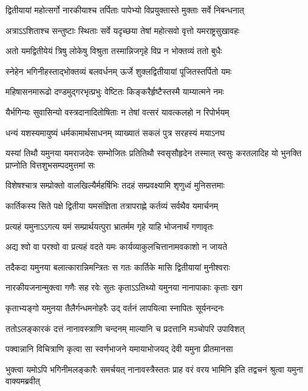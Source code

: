 \twolineshloka
{द्वितीयायां महोत्सर्गो नारकीयाश्च तर्पिताः}
{पापेभ्यो विप्रयुक्तास्ते मुक्ताः सर्वे निबन्धनात्} %

\twolineshloka
{अत्राऽऽशिताश्च सन्तुष्टाः स्थिताः सर्वे यदृच्छया}
{तेषां महोत्सवो वृत्तो यमराष्ट्रसुखावहः} %

\twolineshloka
{अतो यमद्वितीयेयं त्रिषु लोकेषु विश्रुता}
{तस्मान्निजगृहे विप्र न भोक्तव्यं ततो बुधैः} %

\twolineshloka
{स्नेहेन भगिनीहस्ताद्भोक्तव्यं बलवर्धनम्}
{ऊर्जे शुक्लद्वितीयायां पूजितस्तर्पितो यमः} %

\twolineshloka
{महिषासनमारूढो दण्डमुद्गरभृत्प्रभुः}
{वेष्टितः किङ्करैर्हृष्टैस्तस्मै याम्यात्मने नमः} %

\twolineshloka
{यैर्भगिन्यः सुवासिन्यो वस्त्रदानादितोषिताः}
{न तेषां वत्सरं यावत्कलहो न रिपोर्भयम्} %

\twolineshloka
{धन्यं यशस्यमायुष्यं धर्मकामार्थसाधनम्}
{व्याख्यातं सकलं पुत्र सरहस्यं मयाऽनघ} %

\fourlineindentedshloka
{यस्यां तिथौ यमुनया यमराजदेवः}
{सम्भोजितः प्रतितिथौ स्वसृसौहृदेन}
{तस्मात् स्वसुः करतलादिह यो भुनक्ति}
{प्राप्नोति वित्तशुभसम्पदमुत्तमां सः} %

\twolineshloka
{विशेषश्चात्र सम्प्रोक्तो वालखिल्यैर्महर्षिभिः}
{तदहं सम्प्रवक्ष्यामि शृणुध्वं मुनिसत्तमाः} %


\twolineshloka
{कार्तिकस्य सिते पक्षे द्वितीया यमसंज्ञिता}
{तत्रापराह्णे कर्तव्यं सर्वथैव यमार्चनम्} %

\twolineshloka
{प्रत्यहं यमुनाऽऽगत्य यमं सम्प्रार्थयत्पुरा}
{भ्रातर्मम गृहे याहि भोजनार्थं गणावृतः} %

\twolineshloka
{अद्य श्वो वा परश्वो वा प्रत्यहं वदते यमः}
{कार्यव्याकुलचित्तानामवकाशो न जायते} %

\twolineshloka
{तदैकदा यमुनया बलात्कारान्निमन्त्रितः}
{स गतः कार्तिके मासि द्वितीयायां मुनीश्वराः} %

\twolineshloka
{नारकीयजनान्मुक्त्वा गणैः सह रवेः सुतः}
{कृताऽऽतिथ्यो यमुनया नानापाकाः कृताः खग} %

\twolineshloka
{कृताभ्यङ्गो यमुनया तैलैर्गन्धमनोहरैः}
{उद् वर्तनं लापयित्वा स्नापितः सूर्यनन्दनः} %

\twolineshloka
{ततोऽलङ्कारकं दत्तं नानावस्त्राणि चन्दनम्}
{माल्यानि च प्रदत्तानि मञ्चोपरि उपाविशत्} %

\twolineshloka
{पक्वान्नानि विचित्राणि कृत्वा सा स्वर्णभाजने}
{यमायाभोजयद् देवी यमुना प्रीतमानसा} %

\threelineshloka
{भुक्त्वा यमोऽपि भगिनीमलङ्कारैः समर्चयत्}
{नानावस्त्रैस्ततः प्राह वरं वरय भामिनि}
{इति तद्वचनं श्रुत्वा यमुना वाक्यमब्रवीत्} %


